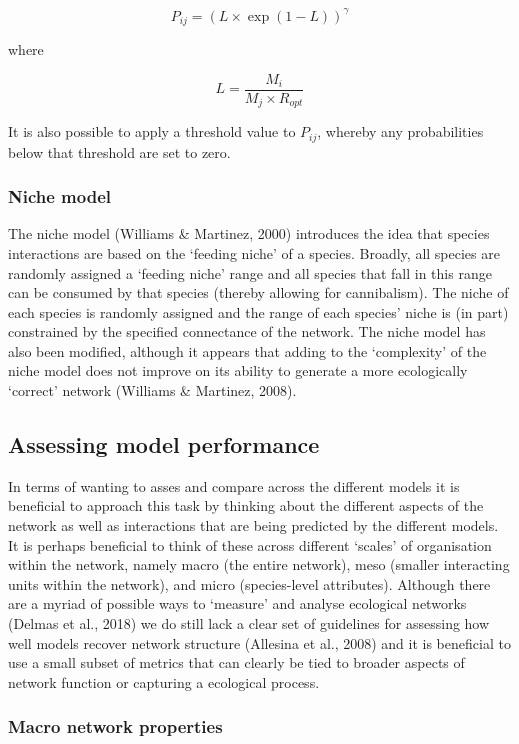 \documentclass[
]{article}
\begin{document}
\[
P_{ij} = (L \times \exp(1 - L))^{\gamma}
\]

where

\[
L = \frac{M_{i}}{M_{j} \times R_{opt}}
\]

It is also possible to apply a threshold value to \(P_{ij}\), whereby
any probabilities below that threshold are set to zero.

\subsubsection{Niche model}\label{niche-model}

The niche model (Williams \& Martinez, 2000) introduces the idea that
species interactions are based on the `feeding niche' of a species.
Broadly, all species are randomly assigned a `feeding niche' range and
all species that fall in this range can be consumed by that species
(thereby allowing for cannibalism). The niche of each species is
randomly assigned and the range of each species' niche is (in part)
constrained by the specified connectance of the network. The niche model
has also been modified, although it appears that adding to the
`complexity' of the niche model does not improve on its ability to
generate a more ecologically `correct' network (Williams \& Martinez,
2008).

\subsection{Assessing model
performance}\label{assessing-model-performance}

In terms of wanting to asses and compare across the different models it
is beneficial to approach this task by thinking about the different
aspects of the network as well as interactions that are being predicted
by the different models. It is perhaps beneficial to think of these
across different `scales' of organisation within the network, namely
macro (the entire network), meso (smaller interacting units within the
network), and micro (species-level attributes). Although there are a
myriad of possible ways to `measure' and analyse ecological networks
(Delmas et al., 2018) we do still lack a clear set of guidelines for
assessing how well models recover network structure (Allesina et al.,
2008) and it is beneficial to use a small subset of metrics that can
clearly be tied to broader aspects of network function or capturing a
ecological process.

\subsubsection{Macro network properties}\label{macro-network-properties}
\end{document}
